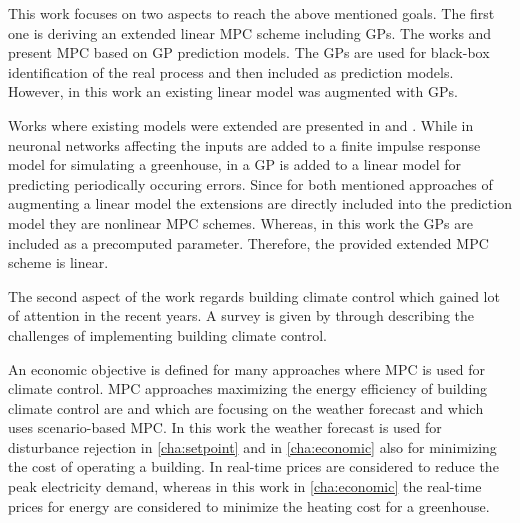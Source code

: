 
This work focuses on two aspects to reach the above mentioned goals.
The first one is deriving an extended linear MPC scheme including GPs.
The works \cite{Kocijan.2003} and \cite{Kocijan.2004} present MPC based on GP prediction models.
The GPs are used for black-box identification of the real process and then included as prediction models.
However, in this work an existing linear model was augmented with GPs.

Works where existing models were extended are presented in \cite{Arahal.2005} and \cite{Klenske.2016}.
While in \cite{Arahal.2005} neuronal networks affecting the inputs are added to a finite impulse response model for simulating a greenhouse, in \cite{Klenske.2016} a GP is added to a linear model for predicting periodically occuring errors.
Since for both mentioned approaches of augmenting a linear model the extensions are directly included into the prediction model they are nonlinear MPC schemes.
Whereas, in this work the GPs are included as a precomputed parameter.
Therefore, the provided extended MPC scheme is linear.\par\medskip

The second aspect of the work regards building climate control which gained lot of attention in the recent years.
A survey is given by \cite{Cigler.2013} through describing the challenges of implementing building climate control.

An economic objective is defined for many approaches where MPC is used for climate control.
MPC approaches maximizing the energy efficiency of building climate control are \cite{Oldewurtel.2010} and \cite{Oldewurtel.2012} which are focusing on the weather forecast and \cite{Zhang.2013} which uses scenario-based MPC.
In this work the weather forecast is used for disturbance rejection in \cref{cha:setpoint} and in \cref{cha:economic} also for minimizing the cost of operating a building.
In \cite{Oldewurtel.2010b} real-time prices are considered to reduce the peak electricity demand, whereas in this work in \cref{cha:economic} the real-time prices for energy are considered to minimize the heating cost for a greenhouse.

